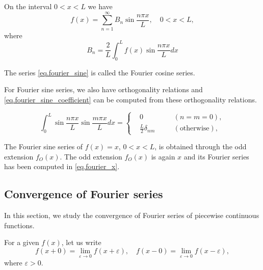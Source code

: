 On the interval $0<x<L$ we have
\begin{equation}\label{eq.fourier_sine}
    f(x)=\sum_{n=1}^{\infty} B_n \sin \frac{n \pi x}{L}, \quad 0<x<L,
\end{equation}
where
\begin{equation}\label{eq.fourier_sine_coefficient}
    B_n=\frac{2}{L} \int_0^L f(x) \sin \frac{n \pi x}{L} d x
\end{equation}

\begin{definition}[]
    The series \eqref{eq.fourier_sine} is called the Fourier cosine series.
\end{definition}

For Fourier sine series, we also have orthogonality relations and \eqref{eq.fourier_sine_coefficient} can be computed from these orthogonality relations.

\begin{theorem}
    \begin{equation}\label{eq.sine_orthogonality}
        \int_{0}^L \sin \frac{n \pi x}{L} \sin \frac{m \pi x}{L} d x=\left\{
                \begin{aligned}
                &0 \quad && (n=m=0), 
                \\
                &\frac{L}{2} \delta_{n m} \quad && (\text{otherwise}),
                \end{aligned}\right.
    \end{equation}
\end{theorem}

\begin{example}
    The Fourier sine series of $f(x)=x$, $0<x<L$, is obtained through the odd extension $f_O(x)$. The odd extension $f_O(x)$ is again $x$ and its Fourier series has been computed in \eqref{eq.fourier_x}.
\end{example}


\subsection{Convergence of Fourier series}

In this section, we study the convergence of Fourier series of piecewise continuous functions.

\begin{definition}
For a given $f(x)$, let us write
\begin{equation}\label{eq.left_right_limit}
    f(x+0)=\lim _{\varepsilon \rightarrow 0} f(x+\varepsilon), \quad f(x-0)=\lim _{\varepsilon \rightarrow 0} f(x-\varepsilon),
\end{equation}
where $\varepsilon>0$.
\end{definition}


